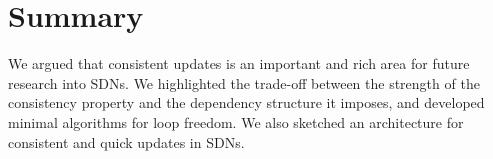 \section{Summary}
\label{sec:conclusions}

We argued that consistent updates is an important and rich area for future research into SDNs.  We highlighted the trade-off between the strength of the consistency property and the dependency structure it imposes, and developed minimal algorithms for loop freedom. We also sketched an architecture for consistent and quick updates in SDNs.  